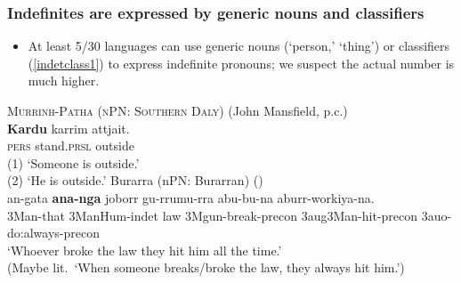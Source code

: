 \documentclass{article}
\begin{document}
\subsubsection{Indefinites are expressed by generic nouns and classifiers \label{sec:gnindf}}
\begin{itemize}
\item At least 5/30 languages can use generic nouns (`person,' `thing') or classifiers (\ref{indetclass1}) to express indefinite pronouns; we suspect the actual number is much higher.
\end{itemize}
\begin{exe}
  \ex\label{ex:mpcli} \textsc{Murrinh-Patha (nPN: Southern Daly)} (John Mansfield, p.c.)\\
  \gll \textbf{Kardu} karrim attjait.\\
  \textsc{pers} stand.\textsc{prsl} outside\\
  \glt (1) `Someone is outside.'\\
  (2) `He is outside.'
  \ex \label{indetclass1} {\sc Burarra (nPN: Burarran)} (\citealt[9]{green87})\\
  \gll   an-gata    \textbf{ana-nga}            joborr    gu-rrumu-rra
  abu-bu-na            aburr-workiya-na. \\ 
  3Man-that     3ManHum-{\sc indet}    law     3Mgun-break-{\sc precon}  3{\sc aug}3Man-hit-{\sc precon}    3{\sc auo}-do:always-{\sc precon} \\
  \glt `Whoever broke the law they hit him all the  time.'\\
  (Maybe lit.\ `When someone breaks/broke the law, they always hit him.')
\end{exe}
\end{document}
